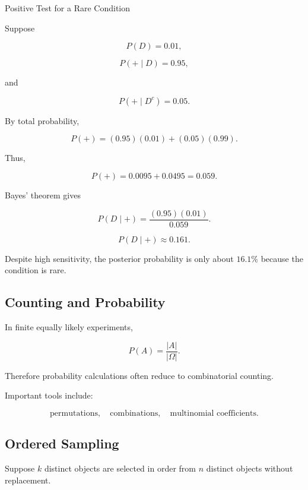 \begin{workedexamplebox}{Positive Test for a Rare Condition}

Suppose

\[
P(D)=0.01,
\]

\[
P(+\mid D)=0.95,
\]

and

\[
P(+\mid D^c)=0.05.
\]

By total probability,

\[
P(+)
=
(0.95)(0.01)
+
(0.05)(0.99).
\]

Thus,

\[
P(+)
=
0.0095+0.0495
=
0.059.
\]

Bayes' theorem gives

\[
P(D\mid+)
=
\frac{(0.95)(0.01)}{0.059}.
\]

\begin{answerbox}
\[
\boxed{
P(D\mid+)
\approx0.161.
}
\]
\end{answerbox}

Despite high sensitivity, the posterior probability is only about
\(16.1\%\) because the condition is rare.

\end{workedexamplebox}

\subsection{Counting and Probability}
\label{subsec:counting-and-probability}

In finite equally likely experiments,

\[
P(A)
=
\frac{|A|}{|\Omega|}.
\]

Therefore probability calculations often reduce to combinatorial
counting.

Important tools include:

\[
\boxed{
\text{permutations},
\quad
\text{combinations},
\quad
\text{multinomial coefficients}.
}
\]

\subsection{Ordered Sampling}
\label{subsec:ordered-sampling-probability}

Suppose \(k\) distinct objects are selected in order from \(n\) distinct
objects without replacement.

